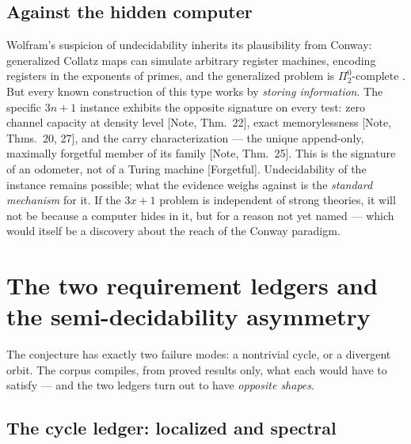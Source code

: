 \documentclass[11pt]{article}
\theoremstyle{definition}
\theoremstyle{remark}
\newcommand{\anchor}[1]{\textup{[#1]}}
\begin{document}
\subsection{Against the hidden computer}

Wolfram's suspicion of undecidability inherits its plausibility from Conway:
generalized Collatz maps can simulate arbitrary register machines, encoding
registers in the exponents of primes, and the generalized problem is
$\Pi^0_2$-complete \cite{Conway1972, KurtzSimon2007}. But every known
construction of this type works by \emph{storing information}. The specific
$3n+1$ instance exhibits the opposite signature on every test: zero channel
capacity at density level \anchor{Note, Thm.~22}, exact memorylessness
\anchor{Note, Thms.~20, 27}, and the carry characterization --- the unique
append-only, maximally forgetful member of its family \anchor{Note, Thm.~25}.
This is the signature of an odometer, not of a Turing machine
\anchor{Forgetful}. Undecidability of the instance remains possible; what the
evidence weighs against is the \emph{standard mechanism} for it. If the
$3x+1$ problem is independent of strong theories, it will not be because a
computer hides in it, but for a reason not yet named --- which would itself
be a discovery about the reach of the Conway paradigm.

\section{The two requirement ledgers and the semi-decidability asymmetry}
\label{sec:ledgers}

The conjecture has exactly two failure modes: a nontrivial cycle, or a
divergent orbit. The corpus compiles, from proved results only, what each
would have to satisfy --- and the two ledgers turn out to have \emph{opposite
shapes}.

\subsection{The cycle ledger: localized and spectral}
\end{document}
